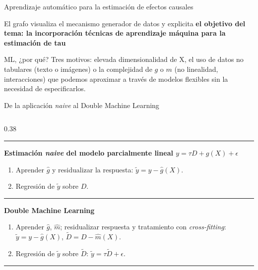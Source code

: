 \documentclass[
  8pt,
  ignorenonframetext,
  aspectratio=169,
  spanish,
]{beamer}
\providecommand{\tightlist}{%
  \setlength{\itemsep}{0pt}\setlength{\parskip}{0pt}}
\begin{document}
\begin{frame}[shrink]{Aprendizaje automático para la estimación de
efectos causales}
{El grafo visualiza el mecanismo generador de datos y explicita
\textbf{el objetivo del tema: la incorporación técnicas de aprendizaje
máquina para la estimación de tau}

ML, ¿por qué? Tres motivos: elevada dimensionalidad de X, el uso de
datos no tabulares (texto o imágenes) o la complejidad de \(g\) o \(m\)
(no linealidad, interacciones) que podemos aproximar a través de modelos
flexibles sin la necesidad de especificarlos.}
\end{frame}

\begin{frame}[shrink]{De la aplicación \emph{naive} al Double Machine
Learning}
\label{de-la-aplicaciuxf3n-naive-al-double-machine-learning}
~

\begin{columns}[T]
\begin{column}{0.38\linewidth}
\begin{center}\rule{0.5\linewidth}{0.5pt}\end{center}

\textbf{Estimación \emph{naive} del modelo parcialmente lineal
\(y=\tau D + g(X)+ \epsilon\)}

\begin{enumerate}
\tightlist
\item
  Aprender \(\hat{g}\) y residualizar la respuesta:
  \(\tilde{y}=y-\hat{g}(X)\).\\
\item
  Regresión de \(\tilde{y}\) sobre \(D\).
\end{enumerate}

\begin{center}\rule{0.5\linewidth}{0.5pt}\end{center}

\textbf{Double Machine Learning}

\begin{enumerate}
\tightlist
\item
  Aprender \(\hat{g}\), \(\hat{m}\); residualizar respuesta y
  tratamiento con \emph{cross-fitting}: \(\tilde{y}=y-\hat{g}(X)\),
  \(\tilde{D}=D-\hat{m}(X)\).
\item
  Regresión de \(\tilde{y}\) sobre \(\tilde{D}\):
  \(\tilde{y}=\tau\tilde{D}+\epsilon\).
\end{enumerate}

\begin{center}\rule{0.5\linewidth}{0.5pt}\end{center}
\end{column}


\end{columns}
\end{frame}
\end{document}
